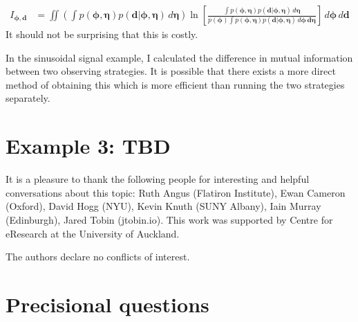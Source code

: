 \documentclass[entropy,article,accept,oneauthor,pdftex,10pt,a4paper]{mdpi}
\renewcommand{\d}{\boldsymbol{d}}
\newcommand{\bphi}{\boldsymbol{\phi}}
\newcommand{\boldeta}{\boldsymbol{\eta}}
\begin{document}
\begin{align}
I_{\bphi, \d} &= \iint
  \left(\int p(\bphi, \boldeta)p(\d | \bphi, \boldeta) \, d\boldeta\right)
                        \ln \left[
  \frac{\int p(\bphi, \boldeta)p(\d | \bphi, \boldeta) \, d\boldeta}
{p(\bphi)\int p(\bphi, \boldeta)p(\d | \bphi, \boldeta) \, d\bphi \, \d\boldeta}\right]
                        \, d\bphi \, d\d
\end{align}
It should not be surprising that this is costly.

In the sinusoidal signal example, I calculated the difference in
mutual information between two observing strategies. It is possible
that there exists a more direct method of obtaining this which
is more efficient than running the two strategies separately.

\section{Example 3: TBD}

It is a pleasure to thank the following people for interesting and helpful
conversations about this topic: Ruth Angus (Flatiron Institute),
Ewan Cameron (Oxford), David Hogg (NYU), Kevin Knuth (SUNY Albany),
Iain Murray (Edinburgh), Jared Tobin (jtobin.io).
This work was supported by Centre for eResearch
at the University of Auckland.




The authors declare no conflicts of interest.

%
\makeatletter
\renewcommand\@biblabel[1]{#1. }
\makeatother





\appendix
\section{Precisional questions}
\end{document}
